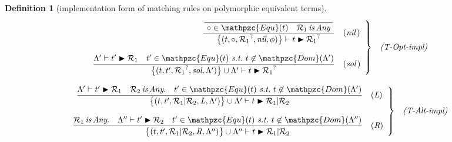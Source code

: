 \documentclass[12pt]{article}
\newtheorem{Definition}{Definition}[section]
\begin{document}
\begin{Definition}[implementation form of matching rules on
    polymorphic equivalent terms]
\begin{displaymath}
\begin{array}{c}
      \begin{array}{rl}

        \left. \begin{array}{rl}
          \dfrac{
            \dfrac{}{
              \raisebox{0.5ex}[2.3ex][0ex]{
                $\circ \in \mathpzc{Equ}(t)
                  \quad \mathcal{R}_1 \,\text{\it is}\, \text{\it Any}$
              }
            }
          }{
            \bigl\{(t, \circ, {\mathcal{R}_1}^?, \text{\it nil}, \phi)
             \bigr\} \vdash t \blacktriangleright {\mathcal{R}_1}^?
          }  &  (\text{\it nil}\,)  \\
          \\
          
          \dfrac{
            \Lambda' \vdash t' \blacktriangleright \mathcal{R}_1 \quad
             t' \in \mathpzc{Equ}(t)\ \text{\it s.t.}\
              t \not\in \mathpzc{Dom}(\Lambda')
          }{
            \bigl\{(t, t', {\mathcal{R}_1}^?, \text{\it sol},
             \Lambda') \bigr\} \cup \Lambda' \vdash
              t \blacktriangleright {\mathcal{R}_1}^?
          }  &  (\text{\it sol}\,)
        \end{array} \right\}  &  \text{\it (T-Opt-impl)}
      \end{array}  \\
      \\
      
      \begin{array}{rl}
        \left. \begin{array}{rl}
          \dfrac{
            \Lambda' \vdash t' \blacktriangleright \mathcal{R}_1 \quad
             \mathcal{R}_2 \,\text{\it is}\, \text{\it Any}. \quad
              t' \in \mathpzc{Equ}(t)\ \text{\it s.t.}\
               t \not\in \mathpzc{Dom}(\Lambda')
          }{
            \bigl\{(t, t', \mathcal{R}_1|\mathcal{R}_2,
             \text{\it L}, \Lambda') \bigr\} \cup \Lambda' \vdash
              t \blacktriangleright \mathcal{R}_1|\mathcal{R}_2
          }  &  (\text{\it L})  \\
          \\
          
          \dfrac{
            \mathcal{R}_1 \,\text{\it is}\, \text{\it Any}. \quad
             \Lambda'' \vdash t' \blacktriangleright \mathcal{R}_2 \quad
              t' \in \mathpzc{Equ}(t)\ \text{\it s.t.}\
               t \not\in \mathpzc{Dom}(\Lambda'')
          }{
            \bigl\{(t, t', \mathcal{R}_1|\mathcal{R}_2,
             \text{\it R}, \Lambda'') \bigr\} \cup \Lambda'' \vdash
              t \blacktriangleright \mathcal{R}_1|\mathcal{R}_2
          }  &  (\text{\it R})
        \end{array} \right\}  &  \text{\it (T-Alt-impl)}
      \end{array}
      
    \end{array}
  \end{displaymath}
\end{Definition}
\end{document}
